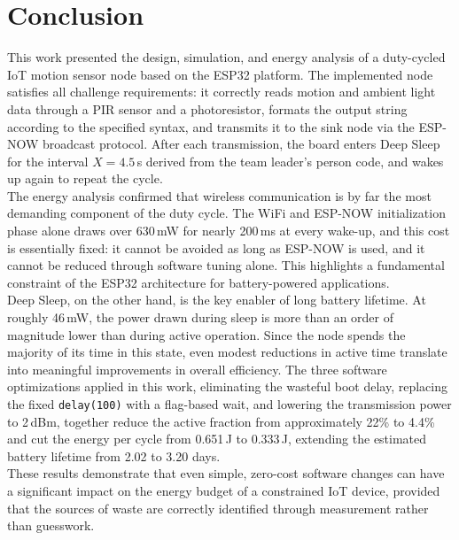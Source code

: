 \documentclass[a4paper,11pt]{article}
\begin{document}
\section{Conclusion}

This work presented the design, simulation, and energy analysis of a duty-cycled
IoT motion sensor node based on the ESP32 platform. The implemented node satisfies
all challenge requirements: it correctly reads motion and ambient light data through
a PIR sensor and a photoresistor, formats the output string according to the
specified syntax, and transmits it to the sink node via the ESP-NOW broadcast
protocol. After each transmission, the board enters Deep Sleep for the interval
$X = 4.5$\,s derived from the team leader's person code, and wakes up again to
repeat the cycle.\\

The energy analysis confirmed that wireless communication is by far the most
demanding component of the duty cycle. The WiFi and ESP-NOW initialization phase
alone draws over 630\,mW for nearly 200\,ms at every wake-up, and this cost is
essentially fixed: it cannot be avoided as long as ESP-NOW is used, and it cannot
be reduced through software tuning alone. This highlights a fundamental constraint
of the ESP32 architecture for battery-powered applications.\\

Deep Sleep, on the other hand, is the key enabler of long battery lifetime. At
roughly 46\,mW, the power drawn during sleep is more than an order of magnitude
lower than during active operation. Since the node spends the majority of its time
in this state, even modest reductions in active time translate into meaningful
improvements in overall efficiency. The three software optimizations applied in
this work, eliminating the wasteful boot delay, replacing the fixed
\texttt{delay(100)} with a flag-based wait, and lowering the transmission power to
2\,dBm, together reduce the active fraction from approximately 22\% to 4.4\%
and cut the energy per cycle from 0.651\,J to 0.333\,J, extending the estimated
battery lifetime from 2.02 to 3.20 days.\\

These results demonstrate that even simple, zero-cost software changes can have a
significant impact on the energy budget of a constrained IoT device, provided that
the sources of waste are correctly identified through measurement rather than
guesswork.
 
\end{document}
